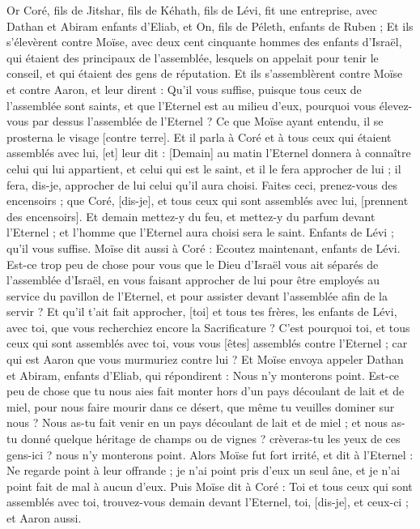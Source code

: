 \begin{multicols}{2}
\VerseOne{}Or Coré, fils de Jitshar, fils de Kéhath, fils de Lévi, fit une entreprise, avec Dathan et Abiram enfants d'Eliab, et On, fils de Péleth, enfants de Ruben ;
Et ils s'élevèrent contre Moïse, avec deux cent cinquante hommes des enfants d'Israël, qui étaient des principaux de l'assemblée, lesquels on appelait pour tenir le conseil, et qui étaient des gens de réputation.
Et ils s'assemblèrent contre Moïse et contre Aaron, et leur dirent : Qu'il vous suffise, puisque tous ceux de l'assemblée sont saints, et que l'Eternel est au milieu d'eux, pourquoi vous élevez-vous par dessus l'assemblée de l'Eternel ?
Ce que Moïse ayant entendu, il se prosterna le visage [contre terre].
Et il parla à Coré et à tous ceux qui étaient assemblés avec lui, [et] leur dit : [Demain] au matin l'Eternel donnera à connaître celui qui lui appartient, et celui qui est le saint, et il le fera approcher de lui ; il fera, dis-je, approcher de lui celui qu'il aura choisi.
Faites ceci, prenez-vous des encensoirs ; que Coré, [dis-je], et tous ceux qui sont assemblés avec lui, [prennent des encensoirs].
Et demain mettez-y du feu, et mettez-y du parfum devant l'Eternel ; et l'homme que l'Eternel aura choisi sera le saint. Enfants de Lévi ; qu'il vous suffise.
Moïse dit aussi à Coré : Ecoutez maintenant, enfants de Lévi.
Est-ce trop peu de chose pour vous que le Dieu d'Israël vous ait séparés de l'assemblée d'Israël, en vous faisant approcher de lui pour être employés au service du pavillon de l'Eternel, et pour assister devant l'assemblée afin de la servir ?
Et qu'il t'ait fait approcher, [toi] et tous tes frères, les enfants de Lévi, avec toi, que vous recherchiez encore la Sacrificature ?
C'est pourquoi toi, et tous ceux qui sont assemblés avec toi, vous vous [êtes] assemblés contre l'Eternel ; car qui est Aaron que vous murmuriez contre lui ?
Et Moïse envoya appeler Dathan et Abiram, enfants d'Eliab, qui répondirent : Nous n'y monterons point.
Est-ce peu de chose que tu nous aies fait monter hors d'un pays découlant de lait et de miel, pour nous faire mourir dans ce désert, que même tu veuilles dominer sur nous ?
Nous as-tu fait venir en un pays découlant de lait et de miel ; et nous as-tu donné quelque héritage de champs ou de vignes ? crèveras-tu les yeux de ces gens-ici ? nous n'y monterons point.
Alors Moïse fut fort irrité, et dit à l'Eternel : Ne regarde point à leur offrande ; je n'ai point pris d'eux un seul âne, et je n'ai point fait de mal à aucun d'eux.
Puis Moïse dit à Coré : Toi et tous ceux qui sont assemblés avec toi, trouvez-vous demain devant l'Eternel, toi, [dis-je], et ceux-ci ; et Aaron aussi.

\end{multicols}
